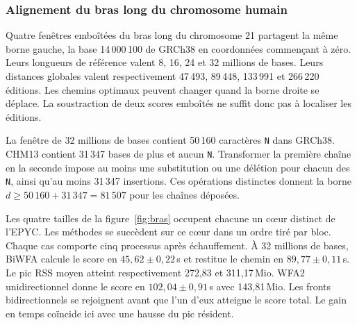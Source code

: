 \subsubsection{Alignement du bras long du chromosome humain}\label{sec:bras}
Quatre fenêtres emboîtées du bras long du chromosome 21 partagent la même borne gauche, la base 14\,000\,100 de GRCh38 en coordonnées commençant à zéro. Leurs longueurs de référence valent 8, 16, 24 et 32 millions de bases. Leurs distances globales valent respectivement 47\,493, 89\,448, 133\,991 et 266\,220 éditions. Les chemins optimaux peuvent changer quand la borne droite se déplace. La soustraction de deux scores emboîtés ne suffit donc pas à localiser les éditions.

La fenêtre de 32 millions de bases contient 50\,160 caractères \texttt{N} dans GRCh38. CHM13 contient 31\,347 bases de plus et aucun \texttt{N}. Transformer la première chaîne en la seconde impose au moins une substitution ou une délétion pour chacun des \texttt{N}, ainsi qu'au moins 31\,347 insertions. Ces opérations distinctes donnent la borne \(d\ge50\,160+31\,347=81\,507\) pour les chaînes déposées.

Les quatre tailles de la figure~\ref{fig:bras} occupent chacune un cœur distinct de l’EPYC. Les méthodes se succèdent sur ce cœur dans un ordre tiré par bloc. Chaque cas comporte cinq processus après échauffement. À 32 millions de bases, BiWFA calcule le score en \(45{,}62\pm0{,}22\)\,s et restitue le chemin en \(89{,}77\pm0{,}11\)\,s. Le pic RSS moyen atteint respectivement 272,83 et 311,17\,Mio. WFA2 unidirectionnel donne le score en \(102{,}04\pm0{,}91\)\,s avec 143,81\,Mio. Les fronts bidirectionnels se rejoignent avant que l'un d'eux atteigne le score total. Le gain en temps coïncide ici avec une hausse du pic résident.

